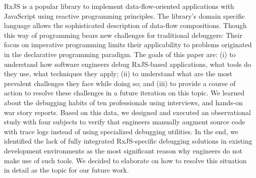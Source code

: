 RxJS is a popular library to implement data-flow-oriented applications with JavaScript using reactive programming principles. The library's domain specific language allows the sophisticated description of data-flow compositions. Though this way of programming bears new challenges for traditional debuggers: Their focus on imperative programming limits their applicability to problems originated in the declarative programming paradigm. The goals of this paper are: (i) to understand how software engineers debug RxJS-based applications, what tools do they use, what techniques they apply; (ii) to understand what are the most prevalent challenges they face while doing so; and (iii) to provide a course of action to resolve these challenges in a future iteration on this topic. We learned about the debugging habits of ten professionals using interviews, and hands-on war story reports. Based on this data, we designed and executed an observational study with four subjects to verify that engineers manually augment source code with trace logs instead of using specialized debugging utilities. In the end, we identified the lack of fully integrated RxJS-specific debugging solutions in existing development environments as the most significant reason why engineers do not make use of such tools. We decided to elaborate on how to resolve this situation in detail as the topic for our future work.